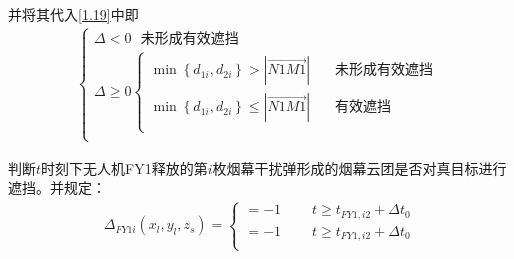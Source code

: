 \documentclass[../main.tex]{subfiles}
\begin{document}
\begin{itemize}
并将其代入\eqref{1.19}中即
\begin{align}\label{1.25657}
	\left\{ \begin{array}{l}
	\varDelta <0\ \ \ \text{未形成有效遮挡}\\
	\varDelta \ge 0\left\{ \begin{array}{l}
	\min \left\{ d_{1i},d_{2i} \right\} >\left| \overrightarrow{N1M1} \right|\ \ \ \ \ \ \ \ \text{未形成有效遮挡}\\
	\min \left\{ d_{1i},d_{2i} \right\} \le \left| \overrightarrow{N1M1} \right|\ \ \ \ \ \ \ \ \text{有效遮挡}\\
\end{array} \right.\\
\end{array} \right. 
\end{align}
\par 判断$t$时刻下无人机FY1释放的第$i$枚烟幕干扰弹形成的烟幕云团是否对真目标进行遮挡。并规定： 
\begin{align}\label{14.9}
	\Delta _{FY1i}\left( x_l,y_l,z_s \right) =\left\{ \begin{array}{l}
	=-1\ \ \ \ \ \ \ \ \ \ t\ge t_{FY1,i2}+\Delta t_0\\
	=-1\ \ \ \ \ \ \ \ \ \ t\ge t_{FY1,i2}+\Delta t_0\\
\end{array} \right.
\end{align}
\end{itemize}
\end{document}
